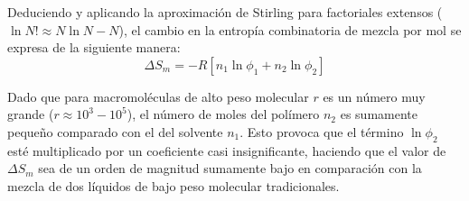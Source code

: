 Deduciendo y aplicando la aproximación de Stirling para factoriales extensos ($\ln N! \approx N \ln N - N$), el cambio en la entropía combinatoria de mezcla por mol se expresa de la siguiente manera:
\begin{equation}
    \Delta S_m = - R \left[ n_1 \ln \phi_1 + n_2 \ln \phi_2 \right]
    \label{eq:entropia_final}
\end{equation}

Dado que para macromoléculas de alto peso molecular $r$ es un número muy grande ($r \approx 10^3 - 10^5$), el número de moles del polímero $n_2$ es sumamente pequeño comparado con el del solvente $n_1$. Esto provoca que el término $\ln \phi_2$ esté multiplicado por un coeficiente casi insignificante, haciendo que el valor de $\Delta S_m$ sea de un orden de magnitud sumamente bajo en comparación con la mezcla de dos líquidos de bajo peso molecular tradicionales.
